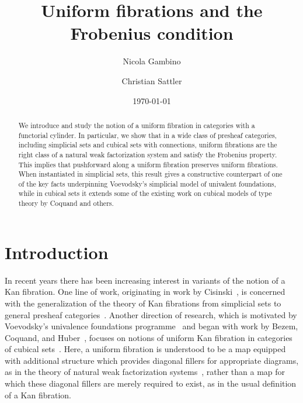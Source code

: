 \documentclass[reqno,10pt,a4paper,oneside,draft]{amsart}
\title{Uniform fibrations and the Frobenius condition}
\begin{document}
\begin{abstract}
We introduce and study the notion of a uniform fibration in categories with a functorial cylinder.
In particular, we show that in a wide class of presheaf categories, including simplicial sets and cubical sets with connections, uniform fibrations are the right class of a natural weak factorization system and satisfy the Frobenius property.
This implies that pushforward along a uniform fibration preserves uniform fibrations.
When instantiated in simplicial sets, this result gives a constructive counterpart of one of the key facts underpinning Voevodsky's simplicial model of univalent foundations, while in cubical sets it extends some of the existing work on cubical models of type theory by Coquand and others.
\end{abstract}

\author{Nicola Gambino}
\address{School of Mathematics, University of Leeds, Leeds LS2 9JT, UK}

\author{Christian Sattler}
\address{School of Mathematics, University of Leeds, Leeds LS2 9JT, UK}

\date{\today}

\maketitle


\section*{Introduction}

In recent years there has been increasing interest in variants of the notion of a Kan fibration.
One line of work, originating in work by Cisinski~\cite{cisinski-asterisque}, is concerned with the generalization of the theory of Kan fibrations from simplicial sets to general presheaf categories~\cite{cisinski-univalence,moerdijk-minimal}.
Another direction of research, which is motivated by Voevodsky's univalence foundations programme~\cite{voevodsky:uf} and began with work by Bezem, Coquand, and Huber~\cite{coquand-cubical-sets}, focuses on notions of uniform Kan fibration in categories of cubical sets~\cite{awodey-cubical,cohen-et-al:cubicaltt,coquand-variation,huber-thesis,pitts-cubical-nominal,swan-awfs}.
Here, a uniform fibration is understood to be a map equipped with additional structure which provides diagonal fillers for appropriate diagrams, as in the theory of natural weak factorization systems~\cite{grandis-tholen-nwfs}, rather than a map for which these diagonal fillers are merely required to exist, as in the usual definition of a Kan fibration.
\end{document}
